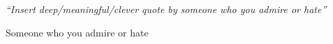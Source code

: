 \documentclass[a4paper, 12pt, twoside, openright]{Thesis} %
\begin{document}

\fancyhead{}  %
\rhead{\thepage}  %
\lhead{}  %

\pagestyle{fancy}  %

\clearpage  %

\pagestyle{empty}  %
\null\vfill

\vfill\vfill\vfill\vfill\vfill\vfill\null
\clearpage  %


\pagestyle{empty}  %

\null\vfill
\textit{``Insert deep/meaningful/clever quote by someone who you admire or hate''}

\begin{flushright}
Someone who you admire or hate
\end{flushright}

\vfill\vfill\vfill\vfill\vfill\vfill\null
\clearpage  %

%
%
%

\pagestyle{empty}  %

\null\vfill

\vfill\vfill\vfill\vfill\vfill\vfill\null
\clearpage  %
\end{document}
